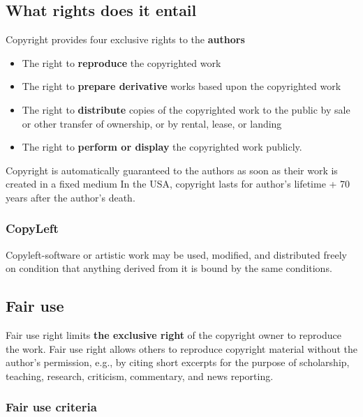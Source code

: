 \documentclass{article}
\begin{document}
\subsection{What rights does it entail}
Copyright provides four exclusive rights to the \textbf{authors}
\begin{itemize}
  \item The right to \textbf{reproduce} the copyrighted work
  \item The right to \textbf{prepare derivative} works based upon the copyrighted work
  \item The right to \textbf{distribute} copies of the copyrighted work to the public by sale or other transfer of ownership, or by rental, lease, or landing 
  \item The right to \textbf{perform or display} the copyrighted work publicly.
\end{itemize}
\begin{flushleft}
Copyright is automatically guaranteed to the authors as soon as their work is created in a fixed medium In the USA, copyright lasts for author’s lifetime + 70 years after the author’s death.
\end{flushleft}

\subsubsection{CopyLeft}

\begin{flushleft}
Copyleft-software or artistic work may be used, modified, and distributed freely on condition that anything derived from it is bound by the same conditions.
\end{flushleft}

\subsection{Fair use}

\begin{flushleft}
Fair use right limits \textbf{the exclusive right} of the copyright owner to reproduce the work. Fair use right allows others to reproduce copyright material without the author’s permission, e.g., by citing short excerpts for the purpose of scholarship, teaching, research, criticism, commentary, and news reporting.
\end{flushleft}

\subsubsection{Fair use criteria}
\end{document}
